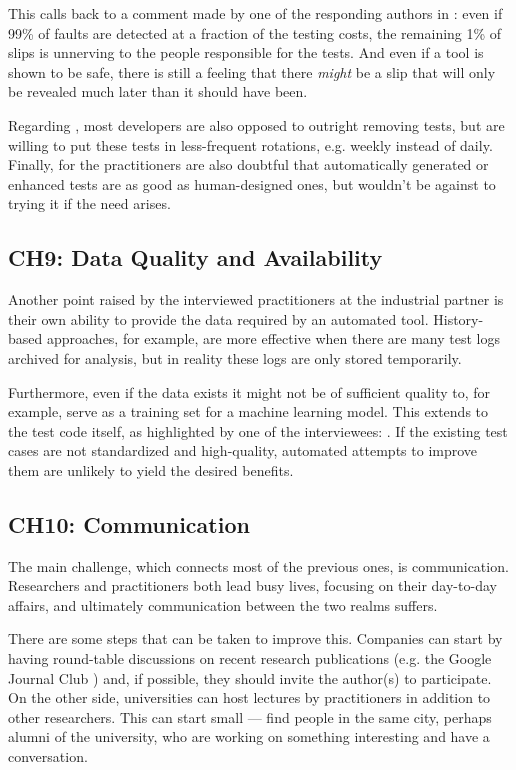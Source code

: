 This calls back to a comment made by one of the responding authors in : even if 99\% of faults are detected at a fraction of the testing costs, the remaining 1\% of slips is unnerving to the people responsible for the tests.
And even if a tool is shown to be safe, there is still a feeling that there \textit{might} be a slip that will only be revealed much later than it should have been.

Regarding \tsr, most developers are also opposed to outright removing tests, but are willing to put these tests in less-frequent rotations, e.g. weekly instead of daily.
Finally, for \tsa the practitioners are also doubtful that automatically generated or enhanced tests are as good as human-designed ones, but wouldn't be against to trying it if the need arises.

\subsection{CH9: Data Quality and Availability}
Another point raised by the interviewed practitioners at the industrial partner is their own ability to provide the data required by an automated tool.
History-based approaches, for example, are more effective when there are many test logs archived for analysis, but in reality these logs are only stored temporarily.

Furthermore, even if the data exists it might not be of sufficient quality to, for example, serve as a training set for a machine learning model.
This extends to the test code itself, as highlighted by one of the interviewees:
.
If the existing test cases are not standardized and high-quality, automated attempts to improve them are unlikely to yield the desired benefits.

\subsection{CH10: Communication}
The main challenge, which connects most of the previous ones, is communication.
Researchers and practitioners both lead busy lives, focusing on their day-to-day affairs, and ultimately communication between the two realms suffers.

There are some steps that can be taken to improve this.
Companies can start by having round-table discussions on recent research publications (e.g. the Google Journal Club \cite{googlejournal}) and, if possible, they should invite the author(s) to participate.
On the other side, universities can host lectures by practitioners in addition to other researchers.
This can start small --- find people in the same city, perhaps alumni of the university, who are working on something interesting and have a conversation.

